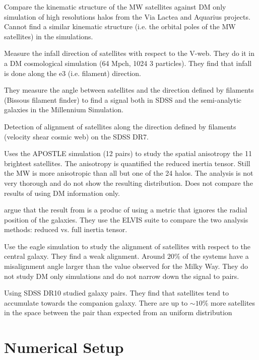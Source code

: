 \documentclass{emulateapj}
\begin{document}
\citep{2012MNRAS.424...80P} Compare the kinematic structure of the MW
satellites against DM only simulation of high resolutions halos from
the Via Lactea and Aquarius projects.  Cannot find a similar kinematic
structure (i.e. the orbital poles of the MW satellites) in the
simulations. 

\citep{2014MNRAS.443.1274L} Measure the infall direction of satellites
with respect to the V-web. They do it in a DM cosmological simulation
(64 Mpch, 1024 3 particles). They find that infall is done along the
e3 (i.e. filament) direction.

\citep{2015MNRAS.450.2727T} They measure the angle between satellites
and the direction defined by filaments (Bissous filament finder) to
find a signal both in SDSS and the semi-analytic galaxies in the
Millennium Simulation.  

\citep{2015ApJ...799..212L} Detection of alignment of satellites along
the direction defined by filaments (velocity shear cosmic web) on the
SDSS DR7.


\citep{2016MNRAS.457.1931S} Uses the APOSTLE simulation (12 pairs) to study the
spatial anisotropy the 11 brightest satellites. The anisotropy is
quantified the reduced inertia tensor. Still the MW is more
anisotropic than all but one of the 24 halos. The analysis is not very
thorough and do not show the resulting distribution. Does not compare
the results of using DM information only. 

\citep{2015ApJ...815...19P} argue that the result from
\citep{2016MNRAS.457.1931S} is a produc of using a metric that ignores
the radial position of the galaxies. They use the ELVIS suite to
compare the two analysis methods: reduced vs. full inertia tensor. 

\citep{2016arXiv160501728S} Use the eagle simulation to study the
alignment of satellites with respect to the central galaxy. They find
a weak alignment. Around $20\%$ of the systems have a misalignment
angle larger than the value observed for the Milky Way. They do not
study DM only simulations and do not narrow down the signal to pairs. 

\citep{2016arXiv160601516L} Using SDSS DR10 studied galaxy pairs. They find
that satellites tend to accumulate towards the companion galaxy. There
are up to $\sim 10\%$ more satellites in the space between the pair
than expected from an uniform distribution

\section{Numerical Setup}
\end{document}
